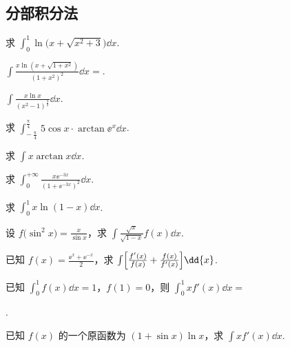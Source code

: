 \subsection{分部积分法}

	\begin{ti}
		求 $\int_{0}^{1} \ln \bigl( x + \sqrt{x^{2} + 3} \bigr) \dd{x}$.
	\end{ti}

	\begin{ti}
		$\int \frac{x \ln ( x + \sqrt{1 + x^{2}} )}{\left( 1 + x^{2} \right)^{2}} \dd{x} = $\htwo.
	\end{ti}

	\begin{ti}
		$\int \frac{x \ln x}{\left( x^{2} - 1 \right)^{\frac{3}{2}}} \dd{x}$.
	\end{ti}

	\begin{ti}
		求 $\int_{-\frac{\uppi}{4}}^{\frac{\uppi}{4}} 5 \cos x \cdot \arctan \ee^{x} \dd{x}$.
	\end{ti}

	\begin{ti}
		求 $\int x \arctan x \dd{x}$.
	\end{ti}

	\begin{ti}
		求 $\int_{0}^{+\infty} \frac{x \ee^{-3x}}{\left( 1 + \ee^{-3x} \right)^{2}} \dd{x}$.
	\end{ti}

	\begin{ti}
		求 $\int_{0}^{1} x \ln (1 - x) \dd{x}$.
	\end{ti}

	\begin{ti}
		设 $f\bigl( \sin^{2}x \bigr) = \frac{x}{\sin x}$，求 $\int \frac{\sqrt{x}}{\sqrt{1 - x}} f(x) \dd{x}$.
	\end{ti}

	\begin{ti}
		已知 $f(x) = \frac{\ee^{x} + \ee^{-x}}{2}$，求 $\int \Bigl[ \frac{f'(x)}{f(x)} + \frac{f(x)}{f'(x)} \Bigr] \dd{x}$.
	\end{ti}

	\begin{ti}
		已知 $\int_{0}^{1} f(x) \dd{x} = 1$，$f(1) = 0$，则 $\int_{0}^{1} x f'(x) \dd{x} = $
		
		\noindent\htwo.
	\end{ti}

	\begin{ti}
		已知 $f(x)$ 的一个原函数为 $(1 + \sin x) \ln x$，求 $\int x f'(x) \dd{x}$.
	\end{ti}

